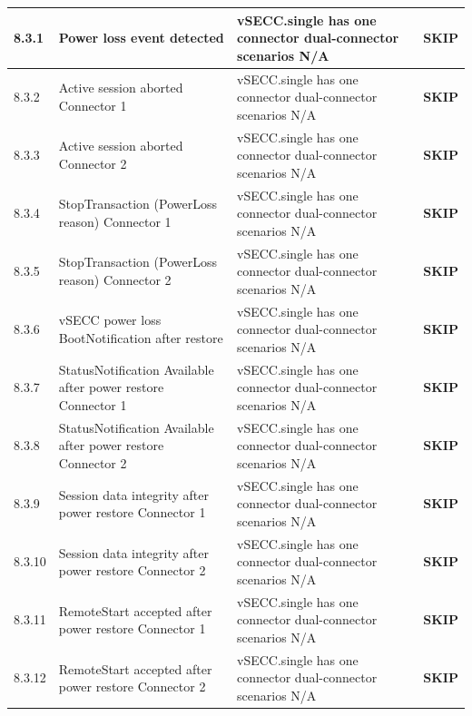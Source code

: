 \documentclass[10pt, a4paper]{article}
\begin{document}
\begin{longtable}{|L{1cm}|L{5.5cm}|M{7cm}|C{1.8cm}|}
\hline
\small 8.3.1 & \small Power loss event detected & vSECC.single has one connector  dual-connector scenarios N/A & \textcolor{skipgray}{\textbf{SKIP}} \\
\hline
\small 8.3.2 & \small Active session aborted  Connector 1 & vSECC.single has one connector  dual-connector scenarios N/A & \textcolor{skipgray}{\textbf{SKIP}} \\
\hline
\small 8.3.3 & \small Active session aborted  Connector 2 & vSECC.single has one connector  dual-connector scenarios N/A & \textcolor{skipgray}{\textbf{SKIP}} \\
\hline
\small 8.3.4 & \small StopTransaction (PowerLoss reason)  Connector 1 & vSECC.single has one connector  dual-connector scenarios N/A & \textcolor{skipgray}{\textbf{SKIP}} \\
\hline
\small 8.3.5 & \small StopTransaction (PowerLoss reason)  Connector 2 & vSECC.single has one connector  dual-connector scenarios N/A & \textcolor{skipgray}{\textbf{SKIP}} \\
\hline
\small 8.3.6 & \small vSECC power loss BootNotification after restore & vSECC.single has one connector  dual-connector scenarios N/A & \textcolor{skipgray}{\textbf{SKIP}} \\
\hline
\small 8.3.7 & \small StatusNotification Available after power restore  Connector 1 & vSECC.single has one connector  dual-connector scenarios N/A & \textcolor{skipgray}{\textbf{SKIP}} \\
\hline
\small 8.3.8 & \small StatusNotification Available after power restore  Connector 2 & vSECC.single has one connector  dual-connector scenarios N/A & \textcolor{skipgray}{\textbf{SKIP}} \\
\hline
\small 8.3.9 & \small Session data integrity after power restore  Connector 1 & vSECC.single has one connector  dual-connector scenarios N/A & \textcolor{skipgray}{\textbf{SKIP}} \\
\hline
\small 8.3.10 & \small Session data integrity after power restore  Connector 2 & vSECC.single has one connector  dual-connector scenarios N/A & \textcolor{skipgray}{\textbf{SKIP}} \\
\hline
\small 8.3.11 & \small RemoteStart accepted after power restore  Connector 1 & vSECC.single has one connector  dual-connector scenarios N/A & \textcolor{skipgray}{\textbf{SKIP}} \\
\hline
\small 8.3.12 & \small RemoteStart accepted after power restore  Connector 2 & vSECC.single has one connector  dual-connector scenarios N/A & \textcolor{skipgray}{\textbf{SKIP}} \\

\end{longtable}
\end{document}
